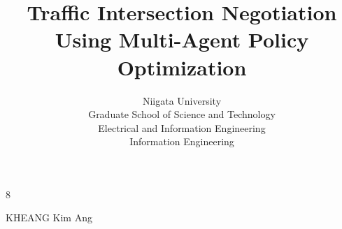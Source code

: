



\begin{toppage}
  \title{Traffic Intersection Negotiation Using Multi-Agent Policy Optimization}{8}

  \author{Niigata University\\Graduate School of Science and Technology\\Electrical and Information Engineering\\Information Engineering }{KHEANG Kim Ang}
\end{toppage}



\contents
\listoffigures
\listoftables







% 






